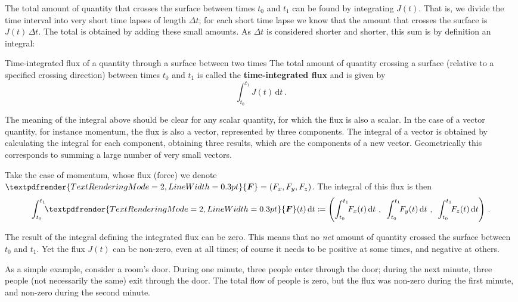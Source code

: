\documentclass[a4paper,12pt,%
onecolumn,oneside,titlepage,%
british%
]{memoir}
\renewcommand*{\bm}[1]{\textpdfrender{TextRenderingMode=2,LineWidth=0.3pt}{\boldsymbol{#1}}}
\newcommand*{\di}{\mathrm{d}}%
\newcommand*{\incr}{\Delta}%
\newcommand*{\defd}{\coloneqq}
\renewcommand*{\|}[1][]{\nonscript\:#1\vert\nonscript\:\mathopen{}}
\newcommand*{\yti}{t_{0}}
\newcommand*{\ytf}{t_{1}}
\newcommand*{\Dt}{\incr t}
\newcommand*{\yJ}{J}
\newcommand*{\yF}{\bm{F}}
\begin{document}
The total amount of quantity that crosses the surface between times $\yti$ and $\ytf$ can be found by integrating $\yJ(t)$. That is, we divide the time interval into very short time lapses of length $\Dt$; for each short time lapse we know that the amount that crosses the surface is $\yJ(t)\,\Dt$. The total is obtained by adding these small amounts. As $\Dt$ is considered shorter and shorter, this sum is by definition an integral:
\begin{definition}{Time-integrated flux of a quantity through a surface between two times}
The total amount of quantity crossing a surface (relative to a specified crossing direction) between times $\yti$ and $\ytf$ is called the \textbf{time-integrated flux} and is given by
  \begin{equation}
    \label{eq:total_flow_integral}
     \int_{\yti}^{\ytf}\!\! \yJ(t)\,\di t\ .
  \end{equation}
\end{definition}

The meaning of the integral above should be clear for any scalar quantity, for which the flux is also a scalar. In the case of a vector quantity, for instance momentum, the flux is also a vector, represented by three components. The integral of a vector is obtained by calculating the integral for each component, obtaining three results, which are the components of a new vector. Geometrically this corresponds to summing a large number of very small vectors.

Take the case of momentum, whose flux (force) we denote $\yF=(F_{x}, F_{y}, F_{z})$. The integral of this flux is then
\begin{equation}
  \label{eq:total_flow_integral_vector}
  \int_{\yti}^{\ytf}\!\! \yF(t)\,\di t \defd
  \Biggl(
  \int_{\yti}^{\ytf}\!\! F_{x}(t)\,\di t \ ,\enspace
  \int_{\yti}^{\ytf}\!\! F_{y}(t)\,\di t \ ,\enspace
  \int_{\yti}^{\ytf}\!\! F_{z}(t)\,\di t
  \Biggr) \ .
\end{equation}

\medskip

\begin{warning}
  The result of the integral defining the integrated flux can be zero. This means that no \emph{net} amount of quantity crossed the surface between $\yti$ and $\ytf$. Yet the flux $\yJ(t)$ can be non-zero, even at all times; of course it needs to be positive at some times, and negative at others.
\end{warning}
As a simple example, consider a room's door. During one minute, three people enter through the door; during the next minute, three people (not necessarily the same) exit through the door. The total flow of people is zero, but the flux was non-zero during the first minute, and non-zero during the second minute.
\end{document}
